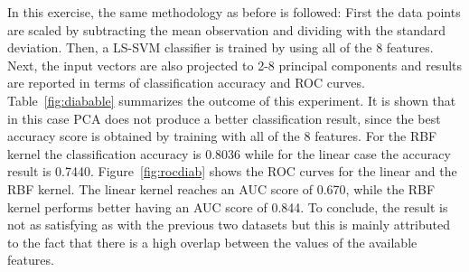 \documentclass{article}
\begin{document}
In this exercise, the same methodology as before is followed: First the data points are scaled by subtracting the mean observation and dividing with the standard deviation. Then, a LS-SVM classifier is trained by using all of the 8 features. Next, the input vectors are also projected to 2-8 principal components and results are reported in terms of classification accuracy and ROC curves. Table~\ref{fig:diabable} summarizes the outcome of this experiment. It is shown that in this case PCA does not produce a better classification result, since the best accuracy score is obtained by training with all of the 8 features. For the RBF kernel the classification accuracy is 0.8036 while for the linear case the accuracy result is 0.7440. Figure~\ref{fig:rocdiab} shows the ROC curves for the linear and the RBF kernel. The linear kernel reaches an AUC score of 0.670, while the RBF kernel performs better having an AUC score of 0.844. To conclude, the result is not as satisfying as with the previous two datasets but this is mainly attributed to the fact that there is a high overlap between the values of the available features. 
\end{document}
